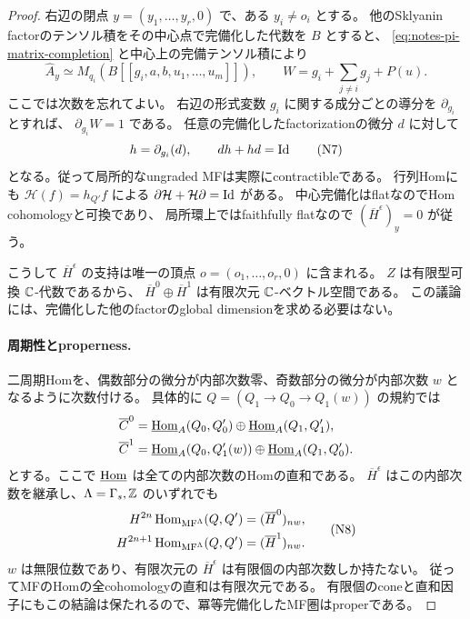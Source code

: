 \begin{proof}
右辺の閉点 \(y=(y_1,\ldots,y_r,0)\) で、ある \(y_i\ne o_i\) とする。
他のSklyanin factorのテンソル積をその中心点で完備化した代数を \(B\) とすると、
\eqref{eq:notes-pi-matrix-completion} と中心上の完備テンソル積により
\[
 \widehat A_y\simeq
 M_{q_i}\!\left(B[[g_i,a,b,u_1,\ldots,u_m]]\right),
 \qquad W=g_i+\sum_{j\ne i}g_j+P(u).
 \tag{N6}\label{eq:notes-pi-local-matrix}
\]
ここでは次数を忘れてよい。
右辺の形式変数 \(g_i\) に関する成分ごとの導分を \(\partial_{g_i}\) とすれば、
\(\partial_{g_i}W=1\) である。
任意の完備化したfactorizationの微分 \(d\) に対して
\[
 h=\partial_{g_i}(d),\qquad dh+hd=\operatorname{Id}
 \tag{N7}\label{eq:notes-pi-contraction}
\]
となる。従って局所的なungraded MFは実際にcontractibleである。
行列Homにも \(\mathcal H(f)=h_{Q'}f\) による
\(\partial\mathcal H+\mathcal H\partial=\operatorname{Id}\) がある。
中心完備化はflatなのでHom cohomologyと可換であり、
局所環上ではfaithfully flatなので
\((\overline H^\epsilon)_y=0\) が従う。

こうして \(\overline H^\epsilon\) の支持は唯一の頂点
\(o=(o_1,\ldots,o_r,0)\) に含まれる。
\(Z\) は有限型可換 \(\mathbb C\)-代数であるから、
\(\overline H^0\oplus\overline H^1\) は有限次元 \(\mathbb C\)-ベクトル空間である。
この議論には、完備化した他のfactorのglobal dimensionを求める必要はない。

\paragraph{周期性とproperness.}
二周期Homを、偶数部分の微分が内部次数零、奇数部分の微分が内部次数 \(w\)
となるように次数付ける。
具体的に \(Q=(Q_1\to Q_0\to Q_1(w))\) の規約では
\[
 \begin{aligned}
 \overline C^0&=\underline{\operatorname{Hom}}_A(Q_0,Q'_0)
       \oplus\underline{\operatorname{Hom}}_A(Q_1,Q'_1),\\
 \overline C^1&=\underline{\operatorname{Hom}}_A(Q_0,Q'_1(w))
       \oplus\underline{\operatorname{Hom}}_A(Q_1,Q'_0).
 \end{aligned}
\]
とする。ここで \(\underline{\operatorname{Hom}}\) は全ての内部次数のHomの直和である。
\(\overline H^\epsilon\) はこの内部次数を継承し、\(\Lambda=\Gamma_s,\mathbb Z\) のいずれでも
\[
 \begin{aligned}
 H^{2n}\operatorname{Hom}_{\operatorname{MF}^\Lambda}(Q,Q')
      &=(\overline H^0)_{nw},\\
 H^{2n+1}\operatorname{Hom}_{\operatorname{MF}^\Lambda}(Q,Q')
      &=(\overline H^1)_{nw}.
 \end{aligned}
 \tag{N8}\label{eq:notes-pi-hom-periodicity}
\]
\(w\) は無限位数であり、有限次元の \(\overline H^\epsilon\) は有限個の内部次数しか持たない。
従ってMFのHomの全cohomologyの直和は有限次元である。
有限個のconeと直和因子にもこの結論は保たれるので、冪等完備化したMF圏はproperである。


\end{proof}
